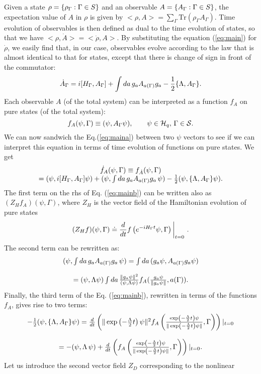 \documentclass[12pt]{article}
\def\be{\begin{equation}}
\def\ee{\end{equation}}
\def\ba{\begin{array}}
\def\ea{\end{array}}
\def\tr{\mbox{Tr}}
\begin{document}
Given
a state $\rho=\{\rho_\Gamma:\Gamma\in{\sl S}\}$ and an observable
$A=\{A_\Gamma:\Gamma\in{\sl S}\}$, the expectation value of $A$ in $\rho$
is given by $<\rho,A>=\sum_\Gamma \tr (\rho_\Gamma A_\Gamma)$. Time
evolution of observables is then defined as dual to the time evolution of
states, so that we have $<\rho,\dot A>=<{\dot \rho},A>$. By substituting
the equation (\ref{eq:main}) for ${\dot \rho}$, we easily find that, in our
case, observables evolve according to the law that is almost identical to
that for states, except that there is change of sign in front of the
commutator: \be {\dot A}_\Gamma=i[H_\Gamma,A_\Gamma]+\int da\, g_a
A_{a(\Gamma)}g_a - {1\over2}\{\Lambda,A_\Gamma\} .\label{eq:maina} \ee Each
observable $A$ (of the total system) can be interpreted as a function $f_A$
on pure states (of the total system): \be
f_A(\psi,\Gamma)\equiv(\psi,A_\Gamma\psi),\qquad \psi\in {\cal H}_q,\,
\Gamma\in {\cal S}. \ee We can now sandwich the Eq.(\ref{eq:maina}) between
two $\psi$ vectors to see if we can interpret this equation in terms of
time evolution of functions on pure states. We get \be \ba{cc} {\dot
f}_A(\psi,\Gamma)\equiv f_{\dot A}(\psi,\Gamma)\\
=(\psi,i[H_\Gamma,A_\Gamma]\psi) +(\psi,\int da\, g_a A_{a(\Gamma)}g_a\,
\psi)-{1\over 2}(\psi,\{\Lambda, A_\Gamma \} \psi ). \ea\label{eq:mainb}
\ee The first term on the rhs of Eq. (\ref{eq:mainb}) can be written also
as $(Z_H f_A)(\psi,\Gamma)$, where $Z_H$ is the vector field of the
Hamiltonian evolution of pure states \be (Z_H f) (\psi,\Gamma)\doteq
{d\over dt}f\left (e^{-iH_{\Gamma} t} \psi,\Gamma \right)\bigg\vert_{t=0} \
.\label{eq:ham} \ee The second term can be rewritten as: \be \ba{c}
(\psi,\int da\, g_a A_{a(\Gamma)}g_a\, \psi) =\int da\,
(g_a\psi,A_{a(\Gamma)}g_a\psi)\cr\cr =(\psi,\Lambda\psi)\int da\, {\Vert
g_a\psi\Vert^2 \over {(\psi,\Lambda\psi )}} f_A({g_a\psi\over {\Vert
g_a\psi\Vert}},a(\Gamma)). \ea\label{eq:second} \ee Finally, the third term
of the Eq. (\ref{eq:mainb}), rewritten in terms of the functions $f_A$,
gives rise to two terms: \be \ba{c} -{1\over
2}(\psi,\{\Lambda,A_\Gamma\}\psi )= {d\over dt}\left( \Vert \exp\left(
-{\Lambda\over 2}t\right)\psi\Vert^2 f_A\left({\exp\left( -{\Lambda\over
2}t\right)\psi\over \Vert \exp\left( -{\Lambda\over
2}t\right)\psi\Vert},\Gamma\right)\right) \vert_{t=0}\cr\cr =
-(\psi,\Lambda\, \psi ) + {d\over dt}\left( f_A\left({\exp\left(
-{\Lambda\over 2}t\right)\psi\over \Vert \exp\left( -{\Lambda\over
2}t\right)\psi\Vert},\Gamma\right) \right)\vert_{t=0}. \ea \ee Let us
introduce the second vector field $Z_D$ corresponding to the nonlinear
\end{document}
